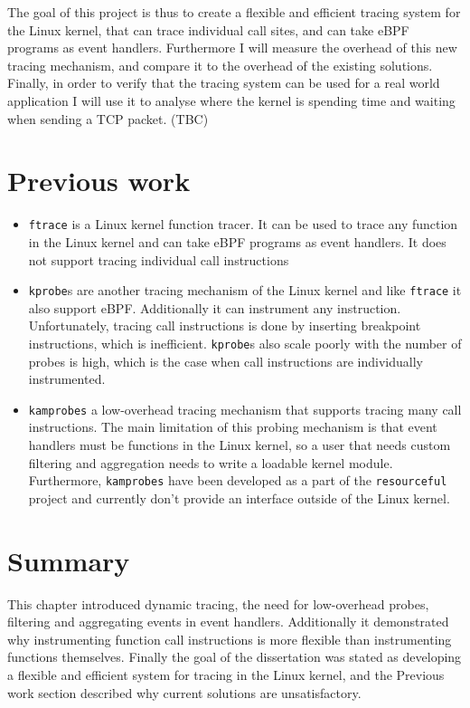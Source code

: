 \documentclass[12pt,twoside,notitlepage]{report}
\begin{document}
		The goal of this project is thus to create a flexible and efficient tracing system for the Linux kernel, that can trace individual call sites, and can take eBPF programs as event handlers. Furthermore I will measure the overhead of this new tracing mechanism, and compare it to the overhead of the existing solutions. Finally, in order to verify that the tracing system can be used for a real world application I will use it to analyse where the kernel is spending time and waiting when sending a TCP packet. (TBC)


    \section{Previous work}
		\begin{itemize}
			\item \texttt{ftrace} is a Linux kernel function tracer. It can be used to trace any function in the Linux kernel and can take eBPF programs as event handlers. It does not support tracing individual call instructions

			\item \texttt{kprobe}s are another tracing mechanism of the Linux kernel and like \texttt{ftrace} it also support eBPF. Additionally it can instrument any instruction. Unfortunately, tracing call instructions is done by inserting breakpoint instructions, which is inefficient. \texttt{kprobe}s also scale poorly with the number of probes is high, which is the case when call instructions are individually instrumented.

			\item \texttt{kamprobes} a low-overhead tracing mechanism that supports tracing many call instructions. The main limitation of this probing mechanism is that event handlers must be functions in the Linux kernel, so a user that needs custom filtering and aggregation needs to write a loadable kernel module. Furthermore, \texttt{kamprobes} have been developed as a part of the \texttt{resourceful} project and currently don't provide an interface outside of the Linux kernel.
		\end{itemize}

	\section{Summary}

		This chapter introduced dynamic tracing, the need for low-overhead probes, filtering and aggregating events in event handlers. Additionally it demonstrated why instrumenting function call instructions is more flexible than instrumenting functions themselves. Finally the goal of the dissertation was stated as developing a flexible and efficient system for tracing in the Linux kernel, and the Previous work section described why current solutions are unsatisfactory.
\end{document}
